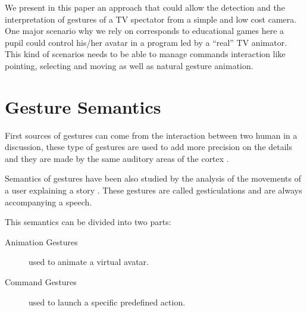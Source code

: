 \documentclass{llncs}
\newcommand\ignore[1]{}
\begin{document}
We present in this paper an approach that could allow the detection and the interpretation of gestures of a TV spectator from a simple and low cost camera. 
One major scenario why we rely on corresponds to educational games here a pupil
could control his/her avatar in a program led by a ``real'' TV animator.
This kind of scenarios needs to be able to manage commands interaction
like pointing, selecting and moving as well as natural gesture animation.


\section{Gesture Semantics}
First sources of gestures can come from the interaction between two human in a
discussion, these type of gestures are used to add more precision on the details
and they are made by the same auditory areas of the cortex \cite{SymbolicGest}.

Semantics of gestures have been also studied by the analysis of the movements of
a user explaining a story \cite{gestureThought}.
These gestures are called gesticulations and are always accompanying a speech. 

This semantics can be divided into two parts:

\begin{description}
 \item[Animation Gestures] used to animate a virtual avatar.
 \item[Command Gestures] used to launch a specific predefined action.
\end{description}


\ignore{
Gesture recognition got the attention of HCI researchers in order to find better
ways to talk to the computer. The first one was the Hand Gestural Cursor
(Put-That-There[]) aiming to the simplification of the means of communication
between human and the machine.
Since then, the gesture definition included more techniques and got applied on
the 2D recognition which is the multi-touch gestures.
}
\end{document}
